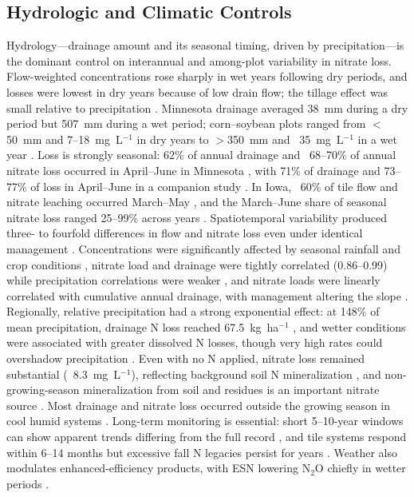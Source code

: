 \documentclass[11pt]{article}
\begin{document}
\subsection{Hydrologic and Climatic Controls}

Hydrology---drainage amount and its seasonal timing, driven by precipitation---is the dominant control on interannual and among-plot variability in nitrate loss. Flow-weighted concentrations rose sharply in wet years following dry periods, and losses were lowest in dry years because of low drain flow; the tillage effect was small relative to precipitation \parencite{RANDALL1995}. Minnesota drainage averaged 38~mm during a dry period but 507~mm during a wet period; corn--soybean plots ranged from $<$50~mm and 7--18~mg~L$^{-1}$ in dry years to $>$350~mm and ~35~mg~L$^{-1}$ in a wet year \parencite{Randall2001}. Loss is strongly seasonal: 62\% of annual drainage and ~68--70\% of annual nitrate loss occurred in April--June in Minnesota \parencite{Randall2003}, with 71\% of drainage and 73--77\% of loss in April--June in a companion study \parencite{Randall2005}. In Iowa, ~60\% of tile flow and nitrate leaching occurred March--May \parencite{Bakhsh2007}, and the March--June share of seasonal nitrate loss ranged 25--99\% across years \parencite{Bakhsh2010}. Spatiotemporal variability produced three- to fourfold differences in flow and nitrate loss even under identical management \parencite{Bakhsh2010}. Concentrations were significantly affected by seasonal rainfall and crop conditions \parencite{Bakhsh2005}, nitrate load and drainage were tightly correlated (0.86--0.99) while precipitation correlations were weaker \parencite{Masri2024}, and nitrate loads were linearly correlated with cumulative annual drainage, with management altering the slope \parencite{OBrien2022}. Regionally, relative precipitation had a strong exponential effect: at 148\% of mean precipitation, drainage N loss reached 67.5~kg~ha$^{-1}$ \parencite{Zhao2016}, and wetter conditions were associated with greater dissolved N losses, though very high rates could overshadow precipitation \parencite{Christianson2015b}. Even with no N applied, nitrate loss remained substantial (~8.3~mg~L$^{-1}$), reflecting background soil N mineralization \parencite{Waring2022}, and non-growing-season mineralization from soil and residues is an important nitrate source \parencite{Gentry2024}. Most drainage and nitrate loss occurred outside the growing season in cool humid systems \parencite{Gordon2005}. Long-term monitoring is essential: short 5--10-year windows can show apparent trends differing from the full record \parencite{Clifford2023}, and tile systems respond within 6--14 months but excessive fall N legacies persist for years \parencite{Jaynes2015}. Weather also modulates enhanced-efficiency products, with ESN lowering N$_2$O chiefly in wetter periods \parencite{Menegaz2025}.
\end{document}
